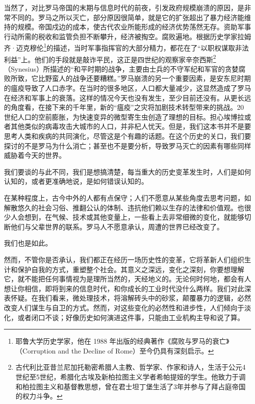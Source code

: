 当然了，对比罗马帝国的末期与信息时代的前夜，引发政府规模崩溃的原因，是非常不同的。罗马之所以灭亡，部分原因很简单，就是它的扩张超出了暴力经济能维持的规模。帝国戍边的成本，使古代农业所能形成的经济优势荡然无存。资助军事行动所需的税收和监管负担不断攀升，经济被掏空。腐败遍地。根据历史学家拉姆齐·迈克穆伦\footnote{耶鲁大学历史学家，他在 1988 年出版的经典著作《腐败与罗马的衰亡》（Corruption and the Decline of Rome）至今仍具有深刻启示。}的描述，当时军事指挥官的大部分精力，都花在了“以职权谋取非法利益”上。他们的手段就是敲诈平民，这正是四世纪的观察家辛奈西斯\footnote{古代利比亚昔兰尼加托勒密希腊人主教、哲学家、作家和诗人，生活于公元4世纪至5世纪，希腊化古埃及新柏拉图主义学者希帕提娅的学生。他致力于调和柏拉图主义和基督教思想，曾在君士坦丁堡生活了3年并参与了拜占庭帝国的权力斗争。}（Synesius）所描述的“和平时期的战争，主要由士兵的不守军纪和军官的贪婪腐败所致，它比野蛮人的战争还要糟糕。”罗马崩溃的另一个重要因素，是安东尼时期的瘟疫导致了人口赤字。在当时的很多地区，人口都大量减少，这显然造成了罗马在经济和军事上的衰落。这样的情况今天也没有发生，至少目前还没有。从更长远的角度看，在接下来的千年里，新的“瘟疫”之灾将加剧技术转型带来的挑战。20 世纪人口的空前膨胀，为快速变异的微型寄生虫创造了理想的目标。担心埃博拉或者其他类似的病毒攻击大城市的人口，并非杞人忧天。但是，我们这本书并不是要思考人类和疾病的共同演化，尽管这是个有趣的话题。在这个历史的关口，我们要探讨的不是罗马为什么消亡；甚至也不是要分析，导致罗马灭亡的因素有哪些同样威胁着今天的世界。

我们要谈的与此不同，我们是想搞清楚，每当重大的历史变革发生时，人们是如何认知的，或者更准确地说，是如何错误认知的。

在某种程度上，古今中外的人都有点保守；人们不愿意从某些角度去思考问题，如解散悠久的社会习俗、推翻公认的体制、违抗他们赖以生存的法律和价值观。也很少人会想到，在气候、技术或其他变量上，一些看上去非常细微的变化，就能够切断他们与父辈世界的联系。罗马人不愿意承认，周遭的世界已经改变了。

我们也是如此。

然而，不管你是否承认，我们都正在经历一场历史性的变革，它将革新人们组织生计和保护自我的方式，重塑整个社会。其意义之深远，变化之深刻，你要想理解它，就不能把任何事情视为是理所当然的，天经地义的。无论何时何地，都会有人想让你相信，即将到来的信息时代，和你成长的工业时代没什么两样。我们对此深表怀疑。在我们看来，微处理技术，将溶解砖头中的砂浆，颠覆暴力的逻辑，必然改变人们谋生与自卫的方式。然而，对这些变化的必然性和进步性，人们倾向于淡化，或者闭口不谈；好像历史如何演进这件事，只能由工业机构主导和说了算。

